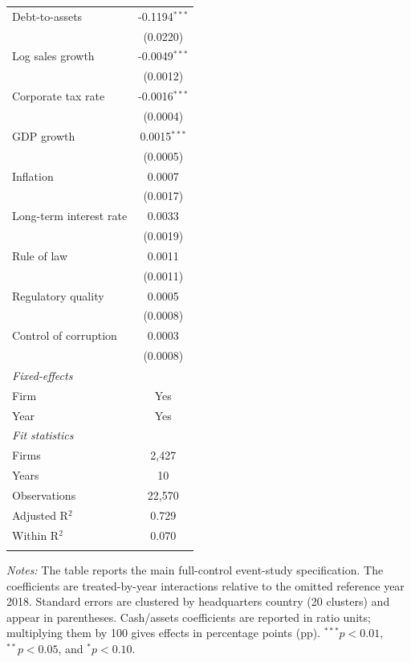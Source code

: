 \begin{table}[H]
\begin{tabular}{lc}
      Debt-to-assets          & -0.1194$^{***}$ \\
                              & (0.0220) \\
      Log sales growth        & -0.0049$^{***}$ \\
                              & (0.0012) \\
      Corporate tax rate      & -0.0016$^{***}$ \\
                              & (0.0004) \\
      GDP growth              & 0.0015$^{***}$ \\
                              & (0.0005) \\
      Inflation               & 0.0007 \\
                              & (0.0017) \\
      Long-term interest rate & 0.0033 \\
                              & (0.0019) \\
      Rule of law             & 0.0011 \\
                              & (0.0011) \\
      Regulatory quality      & 0.0005 \\
                              & (0.0008) \\
      Control of corruption   & 0.0003 \\
                              & (0.0008) \\
      \midrule
      \emph{Fixed-effects} \\
      Firm                    & Yes \\
      Year                    & Yes \\
      \midrule
      \emph{Fit statistics} \\
      Firms                   & 2,427 \\
      Years                   & 10 \\
      Observations            & 22,570 \\
      Adjusted R$^2$          & 0.729 \\
      Within R$^2$            & 0.070 \\
      \midrule \midrule & \tabularnewline
   \end{tabular}

   \par \raggedright
   \textit{Notes:} The table reports the main full-control event-study specification. The coefficients are treated-by-year interactions relative to the omitted reference year 2018. Standard errors are clustered by headquarters country (20 clusters) and appear in parentheses. Cash/assets coefficients are reported in ratio units; multiplying them by 100 gives effects in percentage points (pp). $^{***}p<0.01$, $^{**}p<0.05$, and $^{*}p<0.10$.
\end{table}
